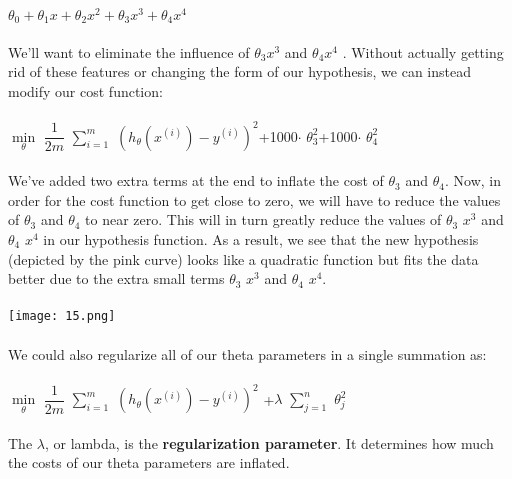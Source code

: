 \documentclass[UTF8]{ctexart}
\begin{document}
\paragraph{}
$\theta_{0}+\theta_{1}x+\theta_{2}x^{2}+\theta_{3}x^{3}+\theta_{4}x^{4}$
\paragraph{}
We'll want to eliminate the influence of $\theta_{3}x^{3}$ and $\theta_{4}x^{4}$ . Without actually getting rid of these features or changing the form of our hypothesis, we can instead modify our cost function:
\paragraph{}
$\min \limits_{\theta}$ $\dfrac{1}{2m}$ $\sum_{i=1}^m$ $(h_{\theta}(x^{(i)})-y^{(i)})^{2}$+1000$\cdot$ $\theta_{3}^{2}$+1000$\cdot$ $\theta_{4}^{2}$
\paragraph{}
We've added two extra terms at the end to inflate the cost of $\theta_{3}$ and $\theta_{4}$. Now, in order for the cost function to get close to zero, we will have to reduce the values of $\theta_{3}$ and $\theta_{4}$ to near zero. This will in turn greatly reduce the values of $\theta_{3}$ $x^{3}$ and $\theta_{4}$ $x^{4}$ in our hypothesis function. As a result, we see that the new hypothesis (depicted by the pink curve) looks like a quadratic function but fits the data better due to the extra small terms $\theta_{3}$ $x^{3}$ and $\theta_{4}$ $x^{4}$.
\paragraph{}
\texttt{[image: 15.png]}
\paragraph{}
We could also regularize all of our theta parameters in a single summation as:
\paragraph{}
\begin{algorithm}
$\min \limits_{\theta}$ $\dfrac{1}{2m}$ $\sum_{i=1}^m$ $(h_{\theta}(x^{(i)})-y^{(i)})^{2}$ +$\lambda$ $\sum_{j=1}^n$ $\theta_{j}^{2}$
\end{algorithm}
\paragraph{}
The $\lambda$, or lambda, is the \textbf{regularization parameter}. It determines how much the costs of our theta parameters are inflated.
\end{document}
